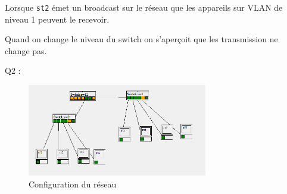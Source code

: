 \documentclass[11pt, openright]{book}
\begin{document}
Lorsque \texttt{st2} émet un broadcast sur le réseau que les appareils sur VLAN de niveau 1 peuvent le recevoir.

Quand on change le niveau du switch on s'aperçoit que les transmission ne change pas. 


\begin{dent}{Q2 :}
	\begin{figure}[ht!]
		\centering
		\includegraphics[width=0.7\textwidth]{./object/g5.png}
		\caption{Configuration du réseau}
	\end{figure}
	
\end{dent}
\end{document}
